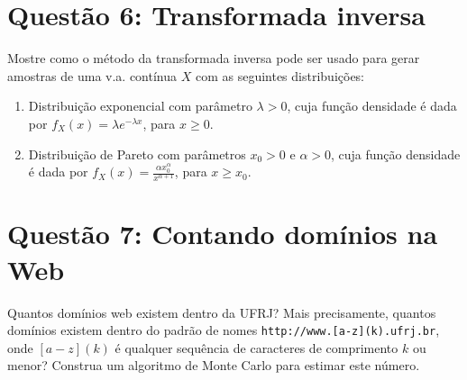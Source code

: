 \documentclass[12 pt]{article}
\begin{document}
\section*{Questão 6: Transformada inversa}

Mostre como o método da transformada inversa pode ser usado para gerar amostras de uma v.a. contínua $X$ com as seguintes distribuições:

\begin{enumerate}
    \item Distribuição exponencial com parâmetro $\lambda > 0$, cuja função densidade é dada por $f_X(x) = \lambda e^{-\lambda x}$, para $x \geq 0$.
    \begin{tcolorbox}[colframe=black, title=Resposta:]

    \end{tcolorbox}
    \item Distribuição de Pareto com parâmetros $x_0 > 0$ e $\alpha > 0$, cuja função densidade é dada por $f_X(x) = \frac{\alpha x_0^\alpha}{x^{\alpha + 1}}$, para $x \geq x_0$.
    \begin{tcolorbox}[colframe=black, title=Resposta:]

    \end{tcolorbox}
\end{enumerate}

\section*{Questão 7: Contando domínios na Web}

Quantos domínios web existem dentro da UFRJ? Mais precisamente, quantos domínios existem dentro do padrão de nomes \texttt{http://www.[a-z](k).ufrj.br}, onde $[a-z](k)$ é qualquer sequência de caracteres de comprimento $k$ ou menor? Construa um algoritmo de Monte Carlo para estimar este número.
\end{document}
